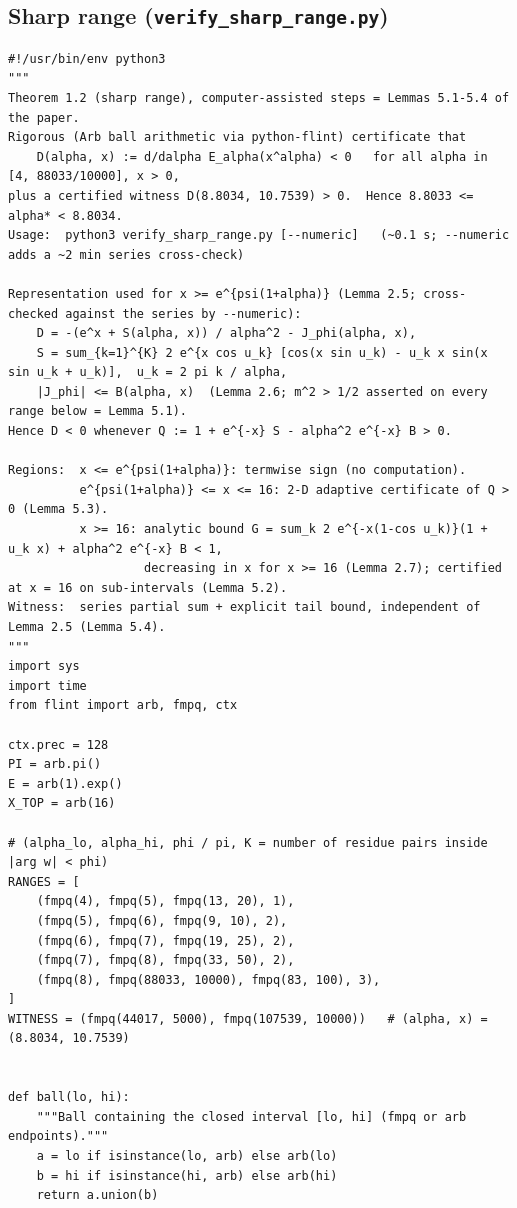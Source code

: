 \documentclass[11pt,a4paper]{article}
\theoremstyle{plain}
\theoremstyle{remark}
\begin{document}
\subsection{Sharp range (\texttt{verify\_sharp\_range.py})}\label{app:C}
\begin{lstlisting}
#!/usr/bin/env python3
"""
Theorem 1.2 (sharp range), computer-assisted steps = Lemmas 5.1-5.4 of the paper.
Rigorous (Arb ball arithmetic via python-flint) certificate that
    D(alpha, x) := d/dalpha E_alpha(x^alpha) < 0   for all alpha in [4, 88033/10000], x > 0,
plus a certified witness D(8.8034, 10.7539) > 0.  Hence 8.8033 <= alpha* < 8.8034.
Usage:  python3 verify_sharp_range.py [--numeric]   (~0.1 s; --numeric adds a ~2 min series cross-check)

Representation used for x >= e^{psi(1+alpha)} (Lemma 2.5; cross-checked against the series by --numeric):
    D = -(e^x + S(alpha, x)) / alpha^2 - J_phi(alpha, x),
    S = sum_{k=1}^{K} 2 e^{x cos u_k} [cos(x sin u_k) - u_k x sin(x sin u_k + u_k)],  u_k = 2 pi k / alpha,
    |J_phi| <= B(alpha, x)  (Lemma 2.6; m^2 > 1/2 asserted on every range below = Lemma 5.1).
Hence D < 0 whenever Q := 1 + e^{-x} S - alpha^2 e^{-x} B > 0.

Regions:  x <= e^{psi(1+alpha)}: termwise sign (no computation).
          e^{psi(1+alpha)} <= x <= 16: 2-D adaptive certificate of Q > 0 (Lemma 5.3).
          x >= 16: analytic bound G = sum_k 2 e^{-x(1-cos u_k)}(1 + u_k x) + alpha^2 e^{-x} B < 1,
                   decreasing in x for x >= 16 (Lemma 2.7); certified at x = 16 on sub-intervals (Lemma 5.2).
Witness:  series partial sum + explicit tail bound, independent of Lemma 2.5 (Lemma 5.4).
"""
import sys
import time
from flint import arb, fmpq, ctx

ctx.prec = 128
PI = arb.pi()
E = arb(1).exp()
X_TOP = arb(16)

# (alpha_lo, alpha_hi, phi / pi, K = number of residue pairs inside |arg w| < phi)
RANGES = [
    (fmpq(4), fmpq(5), fmpq(13, 20), 1),
    (fmpq(5), fmpq(6), fmpq(9, 10), 2),
    (fmpq(6), fmpq(7), fmpq(19, 25), 2),
    (fmpq(7), fmpq(8), fmpq(33, 50), 2),
    (fmpq(8), fmpq(88033, 10000), fmpq(83, 100), 3),
]
WITNESS = (fmpq(44017, 5000), fmpq(107539, 10000))   # (alpha, x) = (8.8034, 10.7539)


def ball(lo, hi):
    """Ball containing the closed interval [lo, hi] (fmpq or arb endpoints)."""
    a = lo if isinstance(lo, arb) else arb(lo)
    b = hi if isinstance(hi, arb) else arb(hi)
    return a.union(b)



\end{lstlisting}
\end{document}
